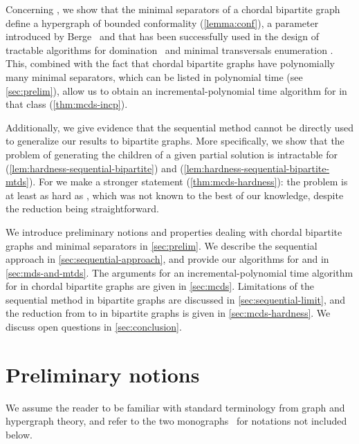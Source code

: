 Concerning \cdomenum{}, we show that the minimal separators of a chordal bipartite graph define a hypergraph of bounded conformality (\autoref{lemma:conf}), a parameter introduced  by Berge~\cite{berge1984hypergraphs} and that has been successfully used in the design of tractable algorithms for domination~\cite{kante2012neighbourhood} and minimal transversals enumeration \cite{khachiyan2007conformality}.
This, combined with the fact that chordal bipartite graphs have polynomially many minimal separators, which can be listed in polynomial time (see \autoref{sec:prelim}), allow us to obtain an incremental-polynomial time algorithm for \cdomenum{} in that class (\autoref{thm:mcds-incp}).

Additionally, we give evidence that the sequential method cannot be directly used to generalize our results to bipartite graphs. 
More specifically, we show that the problem of generating the children of a given partial solution is intractable for \domenum{} (\autoref{lem:hardness-sequential-bipartite}) and \tdomenum{} (\autoref{lem:hardness-sequential-bipartite-mtds}).
For \cdomenum{} we make a stronger statement (\autoref{thm:mcds-hardness}): the problem is at least as hard as \transenum{}, which was not known to the best of our knowledge, despite the reduction being straightforward. 

We introduce preliminary notions and properties dealing with chordal bipartite graphs and minimal separators in \autoref{sec:prelim}.
We describe the sequential approach in \autoref{sec:sequential-approach}, and provide our algorithms for \domenum{} and \tdomenum{} in \autoref{sec:mds-and-mtds}.
The arguments for an incremental-polynomial time algorithm for \cdomenum{} in chordal bipartite graphs are given in \autoref{sec:mcds}.
Limitations of the sequential method in bipartite graphs are discussed in \autoref{sec:sequential-limit}, and the reduction from \transenum{} to \cdomenum{} in bipartite graphs is given in \autoref{sec:mcds-hardness}.
We discuss open questions in \autoref{sec:conclusion}.

\section{Preliminary notions}\label{sec:prelim}

We assume the reader to be familiar with standard terminology from graph and hypergraph theory, and refer to the two monographs~\cite{diestel2012graph,berge1984hypergraphs} for notations not included below.

